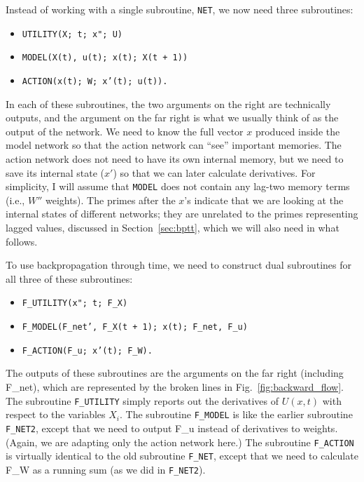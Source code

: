 \documentclass[journal]{IEEEtran} %
\begin{document}
Instead of working with a single subroutine, \texttt{NET}, we now need three subroutines:
\begin{itemize}
    \item \texttt{UTILITY(X; t; x"; U)}
    \item \texttt{MODEL(X(t), u(t); x(t); X(t + 1))}
    \item \texttt{ACTION(x(t); W; x'(t); u(t)).}
\end{itemize}
In each of these subroutines, the two arguments on the right are technically outputs, and the argument on the far right is what we usually think of as the output of the network. We need to know the full vector $x$ produced inside the model network so that the action network can ``see'' important memories. The action network does not need to have its own internal memory, but we need to save its internal state ($x'$) so that we can later calculate derivatives. For simplicity, I will assume that \texttt{MODEL} does not contain any lag-two memory terms (i.e., $W''$ weights). The primes after the $x$'s indicate that we are looking at the internal states of different networks; they are unrelated to the primes representing lagged values, discussed in Section~\ref{sec:bptt}, which we will also need in what follows.

To use backpropagation through time, we need to construct dual subroutines for all three of these subroutines:
\begin{itemize}
    \item \texttt{F\_UTILITY(x"; t; F\_X)}
    \item \texttt{F\_MODEL(F\_net', F\_X(t + 1); x(t); F\_net, F\_u)}
    \item \texttt{F\_ACTION(F\_u; x'(t); F\_W).}
\end{itemize}
The outputs of these subroutines are the arguments on the far right (including F\_net), which are represented by the broken lines in Fig.~\ref{fig:backward_flow}. The subroutine \texttt{F\_UTILITY} simply reports out the derivatives of $U(x, t)$ with respect to the variables $X_i$. The subroutine \texttt{F\_MODEL} is like the earlier subroutine \texttt{F\_NET2}, except that we need to output F\_u instead of derivatives to weights. (Again, we are adapting only the action network here.) The subroutine \texttt{F\_ACTION} is virtually identical to the old subroutine \texttt{F\_NET}, except that we need to calculate F\_W as a running sum (as we did in \texttt{F\_NET2}).
\end{document}
